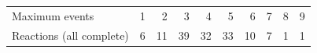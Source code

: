\begin{tabular}{lrrrrrrrrr}\toprule
Maximum events & 1 & 2 & 3 & 4 & 5 & 6 & 7 & 8 & 9\\
Reactions (all complete) & 6 & 11 & 39 & 32 & 33 & 10 & 7 & 1 & 1\\
\bottomrule\end{tabular}
